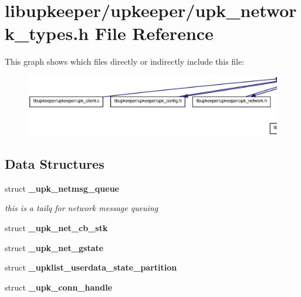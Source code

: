 \section{libupkeeper/upkeeper/upk\_\-network\_\-types.h File Reference}
\label{upk__network__types_8h}
This graph shows which files directly or indirectly include this file:\nopagebreak
\begin{figure}[H]
\begin{center}
\leavevmode
\includegraphics[width=400pt]{upk__network__types_8h__dep__incl}
\end{center}
\end{figure}
\subsection*{Data Structures}
\begin{DoxyCompactItemize}
\item 
struct {\bf \_\-upk\_\-netmsg\_\-queue}
\begin{DoxyCompactList}\small\item\em this is a tailq for network message queuing \end{DoxyCompactList}\item 
struct {\bf \_\-upk\_\-net\_\-cb\_\-stk}
\item 
struct {\bf \_\-upk\_\-net\_\-gstate}
\item 
struct {\bf \_\-upklist\_\-userdata\_\-state\_\-partition}
\item 
struct {\bf \_\-upk\_\-conn\_\-handle}
\end{DoxyCompactItemize}
